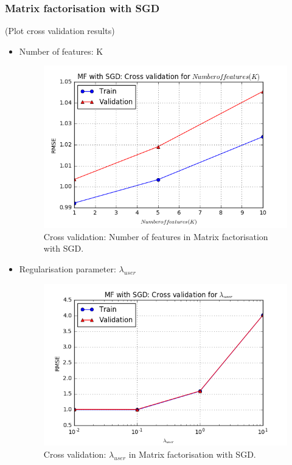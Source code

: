 \documentclass[10pt,conference,compsocconf]{IEEEtran}
\begin{document}
\subsubsection{Matrix factorisation with SGD}
(Plot cross validation results)
\begin{itemize}

\item Number of features: K
\begin{figure}[h!]
  \centering
  \includegraphics[width=\columnwidth]{figures/sgd_cv_numFeatures}
  \caption{Cross validation: Number of features in Matrix factorisation with SGD.}
  \vspace{-3mm}
  \label{fig:sgd_cv_numFeatures}
\end{figure}

\item Regularisation parameter: $\lambda_{user}$
\begin{figure}[h!]
  \centering
  \includegraphics[width=\columnwidth]{figures/sgd_cv_lambdaUser}
  \caption{Cross validation: $\lambda_{user}$ in Matrix factorisation with SGD.}
  \vspace{-3mm}
  \label{fig:sgd_cv_lambdaUser}
\end{figure}


\end{itemize}
\end{document}
